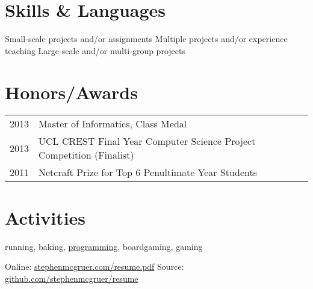 \documentclass[10pt]{article}
\begin{document}

\vspace{-1em}
\section{Skills \& Languages}

\begin{multicols}{3}
\raggedcolumns

\begin{itemize}

\renewcommand{\labelitemi}{}

\renewcommand{\skill}{\textnormal}

\setlength{\itemsep}{1pt}
\setlength{\parskip}{0pt}
\setlength{\parsep}{0pt}

\skills{\bash}{\twoskill}
\skills{\ccpp}{\threeskill}
\skills{\git}{\twoskill}
\skills{\java}{\twoskill}
\skills{\js}{\oneskill}
\skills{\python}{\twoskill}

\end{itemize}

\end{multicols}
\vspace{-1em}
  \begin{footnotesize}
    \oneskill Small-scale projects and/or assignments \hfill 
    \twoskill Multiple projects and/or experience teaching \hfill
    \threeskill Large-scale and/or multi-group projects
  \end{footnotesize}


\vspace{0.75em}
\section{Honors/Awards}
\vspace{0.25em}
\begin{tabularx}{\textwidth}{r|X}
2013 & Master of Informatics, Class Medal \\
2013 & UCL CREST Final Year Computer Science Project Competition (Finalist) \\
2011 & Netcraft Prize for Top 6 Penultimate Year Students \\
\end{tabularx}


\vspace{0.75em}
\section{Activities}
\vspace{0.25em}
running, baking, \href{https://github.com/stephenmcgruer}{programming}, boardgaming, gaming


\null\vfill
\footnotesize{
  Online:  \href{http://www.stephenmcgruer.com/resume.pdf}{stephenmcgruer.com/resume.pdf} \hfill
  Source:  \href{https://github.com/stephenmcgruer/resume}{github.com/stephenmcgruer/resume}
}
\end{document}
